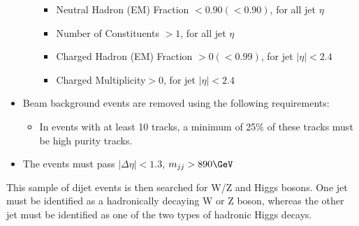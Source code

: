 \begin{itemize}
\begin{itemize}
\begin{itemize}
                     \item   Neutral Hadron (EM) Fraction $< 0.90 (< 0.90)$, for all jet $\eta$
                     \item   Number of Constituents $> 1$, for all jet $\eta$
                     \item   Charged Hadron (EM) Fraction $> 0 (< 0.99)$, for jet $|\eta| < 2.4$
                     \item   Charged Multiplicity$ > 0$, for jet $|\eta| < 2.4$
                 \end{itemize}
        \end{itemize}
\item Beam background events are removed using the following requirements:
        \begin{itemize}
        \item In events with at least 10 tracks, a minimum of 25\% of
          these tracks must be high purity tracks.
        \end{itemize}
\item The events must pass $|\Delta\eta|<1.3$, $m_{jj} > 890  \GeVcc$
\end{itemize}

This sample of dijet events is then searched for W/Z and Higgs bosons.
One jet must be identified as a hadronically decaying W or Z boson, whereas
the other jet must be identified as one of the two types of hadronic
Higgs decays.

